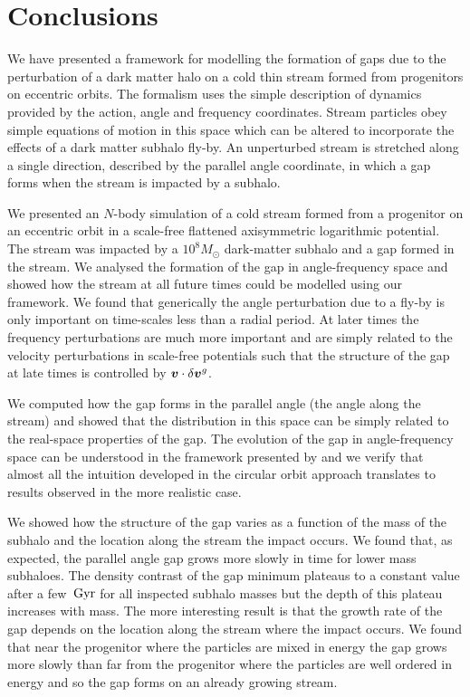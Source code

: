 \documentclass[useAMS,usenatbib,fleqn,a4paper]{mn2e}
\def\Gyr{\,{\rm Gyr}}
\newcommand{\bs}[1]{\bmath{#1}}
\begin{document}
\section{Conclusions}\label{Sect::Conclusions}
We have presented a framework for modelling the formation of gaps due to the perturbation of a dark matter halo on a cold thin stream formed from progenitors on eccentric orbits. The formalism uses the simple description of dynamics provided by the action, angle and frequency coordinates. Stream particles obey simple equations of motion in this space which can be altered to incorporate the effects of a dark matter subhalo fly-by. An unperturbed stream is stretched along a single direction, described by the parallel angle coordinate, in which a gap forms when the stream is impacted by a subhalo.

We presented an $N$-body simulation of a cold stream formed from a progenitor on an eccentric orbit in a scale-free flattened axisymmetric logarithmic potential. The stream was impacted by a $10^8M_\odot$ dark-matter subhalo and a gap formed in the stream. We analysed the formation of the gap in angle-frequency space and showed how the stream at all future times could be modelled using our framework. We found that generically the angle perturbation due to a fly-by is only important on time-scales less than a radial period. At later times the frequency perturbations are much more important and are simply related to the velocity perturbations in scale-free potentials such that the structure of the gap at late times is controlled by $\bs{v}\cdot\delta\bs{v}^g$.

We computed how the gap forms in the parallel angle (the angle along the stream) and showed that the distribution in this space can be simply related to the real-space properties of the gap. The evolution of the gap in angle-frequency space can be understood in the framework presented by \cite{ErkalBelokurov2015} and we verify that almost all the intuition developed in the circular orbit approach translates to results observed in the more realistic case.

We showed how the structure of the gap varies as a function of the mass of the subhalo and the location along the stream the impact occurs. We found that, as expected, the parallel angle gap grows more slowly in time for lower mass subhaloes. The density contrast of the gap minimum plateaus to a constant value after a few $\Gyr$ for all inspected subhalo masses but the depth of this plateau increases with mass. The more interesting result is that the growth rate of the gap depends on the location along the stream where the impact occurs. We found that near the progenitor where the particles are mixed in energy the gap grows more slowly than far from the progenitor where the particles are well ordered in energy and so the gap forms on an already growing stream.
\end{document}
